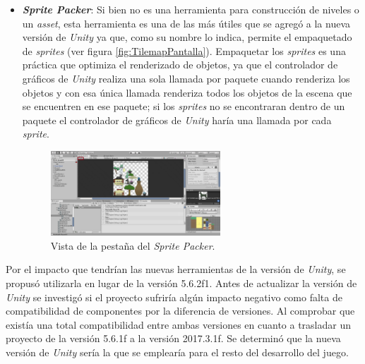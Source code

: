 \begin{itemize}
		\item \textbf{\textit{Sprite Packer}}: Si bien no es una herramienta para 
		construcción de niveles o un \textit{asset}, esta herramienta es una de las 
		más útiles que se agregó a la nueva versión de \textit{Unity} ya que, como 
		su nombre lo indica, permite el empaquetado de \textit{sprites} (ver figura 
		\ref{fig:TilemapPantalla}). Empaquetar 
		los \textit{sprites} es una práctica que optimiza el renderizado de objetos, 
		ya que el controlador de gráficos de \textit{Unity} realiza una sola llamada 
		por paquete cuando renderiza los objetos y con esa única llamada renderiza todos 
		los objetos de la escena que se encuentren en ese paquete; si los 
		\textit{sprites} no se encontraran dentro de un paquete el controlador de 
		gráficos de \textit{Unity} haría una llamada por cada \textit{sprite}.  
			\begin{figure}[h]
    			\centering
    			\includegraphics[width=0.6\textwidth]{02Antecedentes/Imagenes/01.png}
    			\caption{Vista de la pestaña del \textit{Sprite Packer}.}
    			\label{fig:CinemaPantalla}
			\end{figure}
	\end{itemize}
	Por el impacto que tendrían las nuevas herramientas de la versión de 
	\textit{Unity}, se propusó utilizarla en lugar de la versión 5.6.2f1. Antes 
	de actualizar la versión de \textit{Unity} se investigó si el proyecto sufriría 
	algún impacto negativo como falta de compatibilidad de componentes por la 
	diferencia de versiones. Al comprobar que existía una total compatibilidad 
	entre ambas versiones en cuanto a trasladar un proyecto de la versión 5.6.1f 
	a la versión 2017.3.1f. Se determinó que la nueva versión de \textit{Unity} 
	sería la que se emplearía para el resto del desarrollo del juego.
	

%